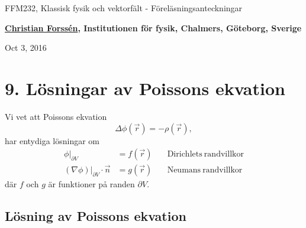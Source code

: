 \documentclass[%
oneside,                 %
final,                   %
10pt]{article}
\begin{document}






\thispagestyle{empty}

\begin{center}
{\LARGE\bf
\begin{spacing}{1.25}
FFM232, Klassisk fysik och vektorfält - Föreläsningsanteckningar
\end{spacing}
}
\end{center}


\begin{center}
{\bf \href{{http://fy.chalmers.se/subatom/tsp/}}{Christian Forssén}, Institutionen för fysik, Chalmers, Göteborg, Sverige${}^{}$} \\ [0mm]
\end{center}

\begin{center}
\end{center}
    

\begin{center}
Oct 3, 2016
\end{center}

\vspace{1cm}


\section{9. Lösningar av Poissons ekvation}

Vi vet att Poissons ekvation
$$
\Delta \phi(\vec{r}) = - \rho(\vec{r}),
$$
har entydiga lösningar om
\begin{align}
\phi|_{\partial V} &= f(\vec{r}) \quad & \mathrm{Dirichlets~randvillkor} \nonumber \\
(\nabla\phi)|_{\partial V} \cdot \vec{n} &= g(\vec{r}) \quad & \mathrm{Neumans~randvillkor} \nonumber 
\end{align}
där $f$ och $g$ är funktioner på randen $\partial V$.

\subsection{Lösning av Poissons ekvation}
\end{document}
